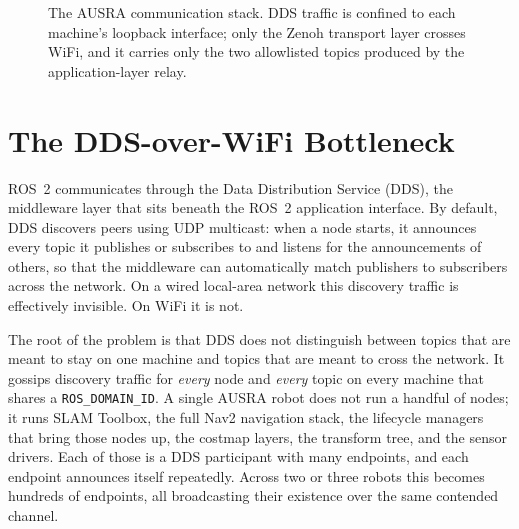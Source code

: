 \begin{figure}[H]
    \centering
    \caption{The AUSRA communication stack. DDS traffic is confined to each machine's loopback interface; only the Zenoh transport layer crosses WiFi, and it carries only the two allowlisted topics produced by the application-layer relay.}
    \label{fig:comms_stack}
\end{figure}

\section{The DDS-over-WiFi Bottleneck}
\label{sec:dds_bottleneck}

ROS~2 communicates through the Data Distribution Service (DDS), the middleware layer that sits beneath the ROS~2 application interface. By default, DDS discovers peers using UDP multicast: when a node starts, it announces every topic it publishes or subscribes to and listens for the announcements of others, so that the middleware can automatically match publishers to subscribers across the network. On a wired local-area network this discovery traffic is effectively invisible. On WiFi it is not.

The root of the problem is that DDS does not distinguish between topics that are meant to stay on one machine and topics that are meant to cross the network. It gossips discovery traffic for \emph{every} node and \emph{every} topic on every machine that shares a \texttt{ROS\_DOMAIN\_ID}. A single AUSRA robot does not run a handful of nodes; it runs SLAM Toolbox, the full Nav2 navigation stack, the lifecycle managers that bring those nodes up, the costmap layers, the transform tree, and the sensor drivers. Each of those is a DDS participant with many endpoints, and each endpoint announces itself repeatedly. Across two or three robots this becomes hundreds of endpoints, all broadcasting their existence over the same contended channel.

